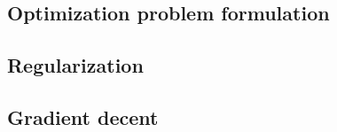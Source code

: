 
\subsection{Optimization problem formulation}


\subsection{Regularization}

\subsection{Gradient decent}







